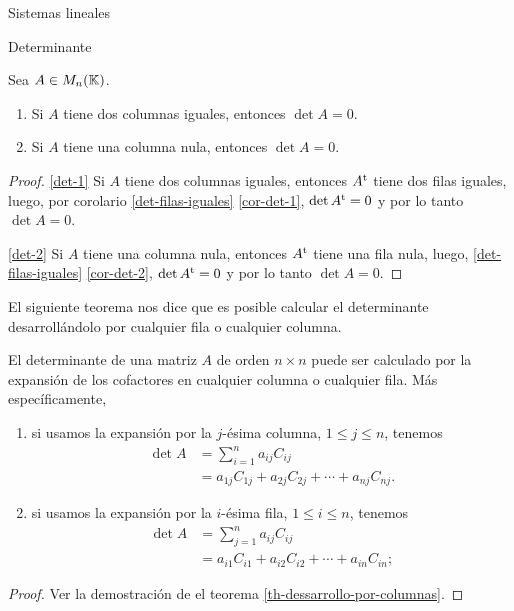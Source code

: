 \begin{chapter}{Sistemas lineales}
\begin{section}{Determinante}
    \begin{corolario} Sea $A  \in M_n(\mathbb K)$.
        \begin{enumerate}
            \item\label{det-1} Si $A$ tiene dos columnas iguales,  entonces $\det A=0$.
            \item\label{det-2} Si $A$ tiene una columna nula, entonces $\det A =0$.
        \end{enumerate}
    \end{corolario}
    \begin{proof}
        \ref{det-1} Si $A$ tiene dos columnas iguales,  entonces $A^{\operatorname{t}}$ tiene dos filas iguales, luego, por corolario \ref{det-filas-iguales} \ref{cor-det-1},  $\det A^{\operatorname{t}} =0$ y por lo tanto $\det A=0$.
        
        \ref{det-2} Si $A$ tiene una columna nula,  entonces $A^{\operatorname{t}}$ tiene una fila nula, luego, \ref{det-filas-iguales} \ref{cor-det-2}, $\det A^{\operatorname{t}} =0$ y por lo tanto $\det A=0$.
    \end{proof}
    
        El siguiente teorema nos dice  que es posible calcular el determinante desarrollándolo por cualquier fila o cualquier columna. 
    
    
    \begin{teorema} \label{th-expancion-cofactores} El determinante de una matriz $A$ de orden $n \times n$ puede ser calculado por la expansión de los cofactores en  cualquier columna o cualquier fila. Más específicamente, 
        \begin{enumerate}
            \item si usamos la expansión por la $j$-ésima columna, $1 \le j \le n$, tenemos
            \begin{align*}
            \det A &= \sum_{i=1}^{n} a_{ij} C_{ij} \\
            & = a_{1j}C_{1j}+a_{2j}C_{2j}+\cdots+a_{nj}C_{nj}.
            \end{align*} 
            \item si usamos la expansión por la $i$-ésima fila, $1 \le i \le n$, tenemos
            \begin{align*}
            \det A &= \sum_{j=1}^{n} a_{ij} C_{ij} \\
            & = a_{i1}C_{i1}+a_{i2}C_{i2}+\cdots+a_{in}C_{in};
            \end{align*} 
        \end{enumerate}
    \end{teorema}
\begin{proof}
    Ver la demostración de el teorema  \ref{th-dessarrollo-por-columnas}.
\end{proof}





\end{section}
\end{chapter}
